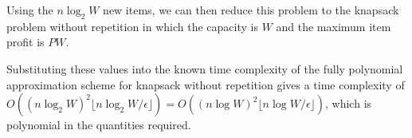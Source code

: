 \documentclass[a4paper,11pt]{article}
\begin{document}
Using the $n \log_2 W$ new items, we can then reduce this problem to the knapsack problem without repetition in which the capacity is $W$ and the maximum item profit is $PW$. \par
Substituting these values into the known time complexity of the fully polynomial approximation scheme for knapsack without repetition gives a time complexity of $O((n \log_2 W)^2 \lfloor n \log_2 W/\epsilon \rfloor) = O((n \log W)^2 \lfloor n \log W/\epsilon \rfloor)$, which is polynomial in the quantities required.
\end{document}
